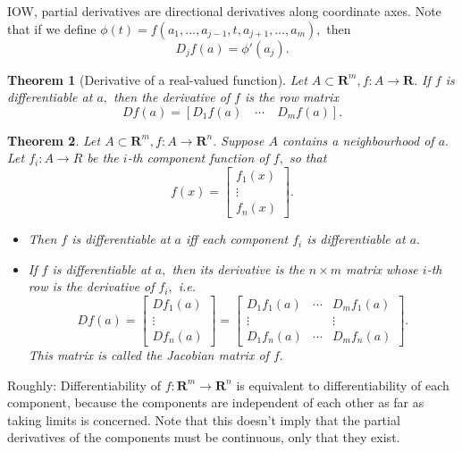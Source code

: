 \documentclass[17pt]{extarticle}
\theoremstyle{plain}
\newtheorem{theorem}{Theorem}
\theoremstyle{definition}
\theoremstyle{remark}
\newcommand{\bR}{\mathbf R}
\begin{document}
IOW, partial derivatives are directional derivatives along coordinate axes. Note
that if we define \( \phi(t) = f(a_1,\ldots, a_{j-1}, t, a_{j+1},\ldots,a_m), \)
then
\[
D_j f(a) = \phi'(a_j).
\]

\begin{theorem}[Derivative of a real-valued function]
  Let \( A \subset \bR^m, f: A \longrightarrow \bR. \) If \( f \) is differentiable at \( a, \) then the derivative of \( f \) is the row matrix
\[
Df(a) = [D_1 f(a) \quad \cdots \quad D_m f(a)].
\]
\end{theorem}

\begin{theorem}
Let \( A \subset \bR^m, f: A \longrightarrow \bR^n. \) Suppose \( A \) contains a neighbourhood of \( a. \) Let \( f_i: A \longrightarrow R \) be the \( i \)-th component function of \( f, \) so that
\[
f(x) = \begin{bmatrix}
f_1 (x) \\
\vdots \\
f_n (x)
\end{bmatrix}.
\]
\begin{itemize}
\item Then \( f \) is differentiable at \( a \) iff each component \( f_i \) is differentiable at \( a. \)

\item If \( f \) is differentiable at \( a, \) then its derivative is the \( n \times m \) matrix whose \( i \)-th row is the derivative of \( f_i,  \) i.e.
\[
D f(a) = \begin{bmatrix}
D f_1 (a) \\
\vdots \\
D f_n (a)
\end{bmatrix} = \begin{bmatrix}
D_1 f_1 (a) & \cdots & D_m f_1 (a) \\
\vdots & & \vdots \\
D_1 f_n (a) & \cdots & D_m f_n (a)
\end{bmatrix}.
\]
  This matrix is called the Jacobian matrix of \( f. \)
\end{itemize}
\end{theorem}

Roughly: Differentiability of \( f: \bR^m \longrightarrow \bR^n \) is equivalent
to differentiability of each component, because the components are independent
of each other as far as taking limits is concerned. Note that this doesn't imply
that the partial derivatives of the components must be continuous, only that
they exist.
\end{document}
